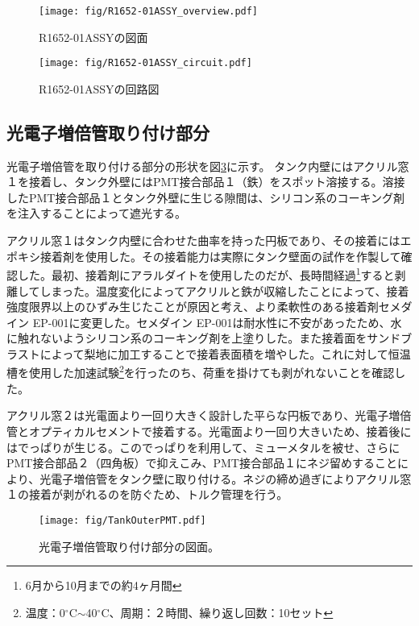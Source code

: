 \documentclass[11pt]{jreport}
\newcommand{\figref}[1]{図\ref{#1}}
\begin{document}
\begin{figure}[htbp]
\centering
\texttt{[image: fig/R1652-01ASSY\_overview.pdf]}
\caption[R1652-01ASSYの寸法]{R1652-01ASSYの図面}
\label{LGPMT}
\end{figure}

\begin{figure}[htbp]
\centering
\texttt{[image: fig/R1652-01ASSY\_circuit.pdf]}
\caption[R1652-01ASSYの回路図]{R1652-01ASSYの回路図}
\label{LGPMTciruit}
\end{figure}
\fi


\subsection{光電子増倍管取り付け部分}

光電子増倍管を取り付ける部分の形状を\figref{SetPMT}に示す。
タンク内壁にはアクリル窓１を接着し、タンク外壁にはPMT接合部品１（鉄）をスポット溶接する。溶接したPMT接合部品１とタンク外壁に生じる隙間は、シリコン系のコーキング剤を注入することによって遮光する。

アクリル窓１はタンク内壁に合わせた曲率を持った円板であり、その接着にはエポキシ接着剤を使用した。その接着能力は実際にタンク壁面の試作を作製して確認した。最初、接着剤にアラルダイトを使用したのだが、長時間経過\footnote{6月から10月までの約4ヶ月間}すると剥離してしまった。温度変化によってアクリルと鉄が収縮したことによって、接着強度限界以上のひずみ生じたことが原因と考え、より柔軟性のある接着剤セメダイン EP-001に変更した。セメダイン EP-001は耐水性に不安があったため、水に触れないようシリコン系のコーキング剤を上塗りした。また接着面をサンドブラストによって梨地に加工することで接着表面積を増やした。これに対して恒温槽を使用した加速試験\footnote{温度：0$^{\circ}$C$\sim$40$^{\circ}$C、周期：２時間、繰り返し回数：10セット}を行ったのち、荷重を掛けても剥がれないことを確認した。

アクリル窓２は光電面より一回り大きく設計した平らな円板であり、光電子増倍管とオプティカルセメントで接着する。光電面より一回り大きいため、接着後にはでっぱりが生じる。このでっぱりを利用して、ミューメタルを被せ、さらにPMT接合部品２（四角板）で抑えこみ、PMT接合部品１にネジ留めすることにより、光電子増倍管をタンク壁に取り付ける。ネジの締め過ぎによりアクリル窓１の接着が剥がれるのを防ぐため、トルク管理を行う。



\begin{figure}[!h]
\centering
\texttt{[image: fig/TankOuterPMT.pdf]}
\caption[光電子増倍管取り付け部分の図面]{光電子増倍管取り付け部分の図面。}
\label{SetPMT}
\end{figure}
\end{document}
